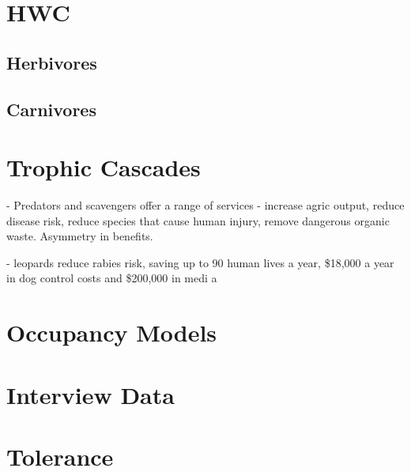 \section{HWC}

\subsection{Herbivores}

\subsection{Carnivores}

\section{Trophic Cascades}

\cite{O_Bryan_2018} - Predators and scavengers offer a range of services - increase agric output, reduce disease risk, reduce species that cause human injury, remove dangerous organic waste. Asymmetry in benefits.

\cite{Braczkowski_2018} - leopards reduce rabies risk, saving up to 90 human lives a year, \$18,000 a year in dog control costs and \$200,000 in medi a

\section{Occupancy Models}

\section{Interview Data}

\section{Tolerance}
